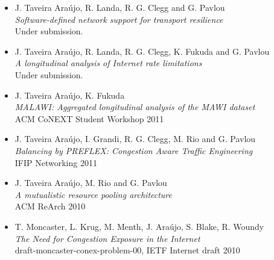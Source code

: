 \begin{itemize}
    \item J. Taveira Ara\'{u}jo, R. Landa, R. G. Clegg and G. Pavlou \\
            \emph{Software-defined network support for transport resilience} \\
            Under submission.
    \item J. Taveira Ara\'{u}jo, R. Landa, R. G. Clegg, K. Fukuda and G. Pavlou \\
            \emph{A longitudinal analysis of Internet rate limitations} \\
            Under submission.
    \item J. Taveira Ara\'{u}jo, K. Fukuda \\
            \emph{MALAWI: Aggregated longitudinal analysis of the MAWI dataset} \\
            {ACM CoNEXT Student Workshop 2011}
    \item J. Taveira Ara\'{u}jo, I. Grandi, R. G. Clegg, M. Rio and G. Pavlou \\
            \emph{Balancing by PREFLEX: Congestion Aware Traffic Engineering} \\
            {IFIP Networking 2011}
    \item J. Taveira Ara\'{u}jo, M. Rio and G. Pavlou \\
        \emph{A mutualistic resource pooling architecture} \\
        {ACM ReArch 2010}
    \item T. Moncaster, L. Krug, M. Menth, J. Ara\'{u}jo, S. Blake, R. Woundy \\
        \emph{The Need for Congestion Exposure in the Internet} \\
        {draft-moncaster-conex-problem-00, IETF Internet draft 2010}
\end{itemize}

